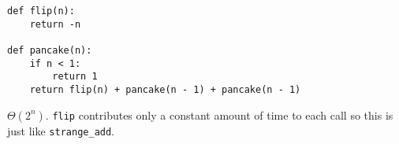 \begin{blocksection}
\question \begin{lstlisting}
def flip(n):
    return -n

def pancake(n):
    if n < 1:
        return 1
    return flip(n) + pancake(n - 1) + pancake(n - 1)
\end{lstlisting}

\begin{solution}
$\Theta(2^n)$. \lstinline$flip$ contributes only a constant amount of time to each call so this is just like \lstinline$strange_add$.
\end{solution}
\end{blocksection}
